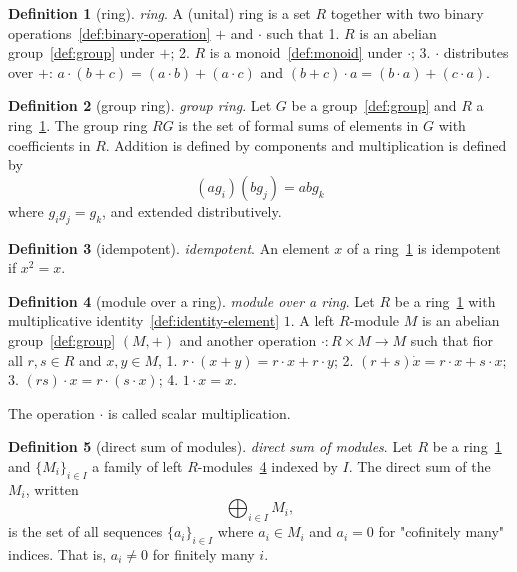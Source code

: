 \documentclass[12pt,a4paper]{article}
\theoremstyle{definition}
\newtheorem{definition}{Definition}
\begin{document}
\begin{definition}[ring]\label{def:ring}
\emph{ring}. A (unital) ring is a set $R$ together with two binary operations~\ref{def:binary-operation} $+$ and $\cdot$ such that
1. $R$ is an abelian group~\ref{def:group} under $+$;
2. $R$ is a monoid~\ref{def:monoid} under $\cdot$;
3. $\cdot$ distributes over $+$: $a\cdot (b+c)=(a\cdot b) + (a\cdot c)$ and $(b+c)\cdot a = (b\cdot a) + (c\cdot a)$.
\end{definition}

\begin{definition}[group ring]\label{def:group-ring}
\emph{group ring}. Let $G$ be a group~\ref{def:group} and $R$ a ring~\ref{def:ring}. The group ring $RG$ is the set of formal sums of elements in $G$ with coefficients in $R$. Addition is defined by components and multiplication is defined by $$(ag_i)(bg_j) = abg_k$$ where $g_ig_j = g_k$, and extended distributively.
\end{definition}

\begin{definition}[idempotent]\label{def:idempotent}
\emph{idempotent}. An element $x$ of a ring~\ref{def:ring} is idempotent if $x^2 = x$.
\end{definition}

\begin{definition}[module over a ring]\label{def:module-over-a-ring}
\emph{module over a ring}. Let $R$ be a ring~\ref{def:ring} with multiplicative identity~\ref{def:identity-element} $1$. A left $R$-module $M$ is an abelian group~\ref{def:group} $(M, +)$ and another operation $\cdot : R\times M \to M$ such that fior all $r,s\in R$ and $x,y\in M$,
1. $r\cdot (x+y) = r\cdot x + r\cdot y$;
2. $(r+s)\dot x = r\cdot x + s\cdot x$;
3. $(rs)\cdot x = r\cdot (s\cdot x)$;
4. $1\cdot x = x$.

The operation $\cdot$ is called scalar multiplication.
\end{definition}

\begin{definition}[direct sum of modules]\label{def:direct-sum-of-modules}
\emph{direct sum of modules}. Let $R$ be a ring~\ref{def:ring} and $\{M_i\}_{i\in I}$ a family of left $R$-modules~\ref{def:module-over-a-ring} indexed by $I$. The direct sum of the $M_i$, written $$\bigoplus_{i\in I} M_i,$$ is the set of all sequences $\{a_i\}_{i\in I}$ where $a_i \in M_i$ and $a_i=0$ for "cofinitely many" indices. That is, $a_i \neq 0$ for finitely many $i$.
\end{definition}
\end{document}
